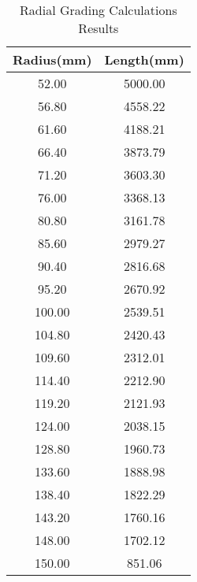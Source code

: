 \begin{table}[!htb]
\caption{Radial Grading Calculations Results}
\label{table:radialvals}
\begin{center}
\begin{tabular}{cc}
\toprule
\textbf{Radius(mm)} & \textbf{Length(mm)} \\ \toprule
52.00 & 5000.00 \\
56.80 & 4558.22 \\
61.60 & 4188.21 \\
66.40 & 3873.79 \\
71.20 & 3603.30 \\
76.00 & 3368.13 \\
80.80 & 3161.78 \\
85.60 & 2979.27 \\
90.40 & 2816.68 \\
95.20 & 2670.92 \\
100.00 & 2539.51 \\
104.80 & 2420.43 \\
109.60 & 2312.01 \\
114.40 & 2212.90 \\
119.20 & 2121.93 \\
124.00 & 2038.15 \\
128.80 & 1960.73 \\
133.60 & 1888.98 \\
138.40 & 1822.29 \\
143.20 & 1760.16 \\
148.00 & 1702.12 \\
150.00 & 851.06 \\
\bottomrule
\end{tabular}
\end{center}
\end{table}
